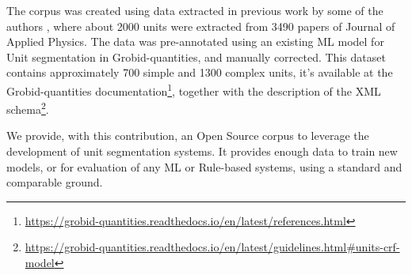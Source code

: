 \documentclass[a4j,11pt]{article}
\begin{document}
The corpus was created using data extracted in previous work by some of the authors \autocite{suzuki2018constructing}, where about 2000 units were extracted from 3490 papers of Journal of Applied Physics. The data was pre-annotated using an existing ML model for Unit segmentation in Grobid-quantities, and manually corrected. This dataset contains approximately 700 simple and 1300 complex units, it's available at the Grobid-quantities documentation\footnote{\url{https://grobid-quantities.readthedocs.io/en/latest/references.html}}, together with the description of the XML schema\footnote{\url{https://grobid-quantities.readthedocs.io/en/latest/guidelines.html#units-crf-model}}.

We provide, with this contribution, an Open Source corpus to leverage the development of unit segmentation systems. It provides enough data to train new models, or for evaluation of any ML or Rule-based systems, using a standard and comparable ground. 
\end{document}
